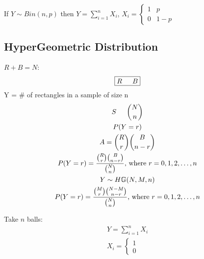 \documentclass{article}
\begin{document}
If $Y \sim Bin(n,p)$ then $Y = \sum_{i=1}^{n}X_i$,
$
    X_i = \begin{cases}
        1 & p   \\
        0 & 1-p
    \end{cases}
$

\subsection{HyperGeometric Distribution}
$R + B = N$:
\[
    \boxed{R \text{\indent } B}
\]
Y = \# of rectangles in a sample of size n
\begin{gather*}
    S \text{\indent } \binom{N}{n} \\
    P(Y=r) \\
    A = \binom{R}{r}\binom{B}{n-r} \\
    P(Y=r) = \frac{\binom{R}{r}\binom{B}{n-r}}{\binom{N}{n}} \text{, where } r = 0,1,2,\dots , n \\
    Y \sim H \mathbb{G}(N,M,n) \\
    P(Y=r) = \frac{\binom{M}{r}\binom{N-M}{n-r}}{\binom{N}{n}} \text{, where }
    r = 0,1,2, \dots , n
\end{gather*}

Take $n$ balls:
\begin{gather*}
    Y = \sum_{i=1}^{n} X_i \\
    X_i = \begin{cases}
        1 \\
        0
    \end{cases}
\end{gather*}
\end{document}
